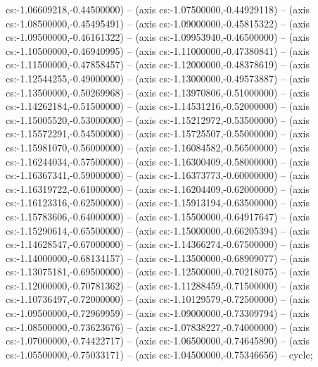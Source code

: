 cs:-1.06609218,-0.44500000) -- (axis cs:-1.07500000,-0.44929118) -- (axis cs:-1.08500000,-0.45495491) -- (axis cs:-1.09000000,-0.45815322) -- (axis cs:-1.09500000,-0.46161322) -- (axis cs:-1.09953940,-0.46500000) -- (axis cs:-1.10500000,-0.46940995) -- (axis cs:-1.11000000,-0.47380841) -- (axis cs:-1.11500000,-0.47858457) -- (axis cs:-1.12000000,-0.48378619) -- (axis cs:-1.12544255,-0.49000000) -- (axis cs:-1.13000000,-0.49573887) -- (axis cs:-1.13500000,-0.50269968) -- (axis cs:-1.13970806,-0.51000000) -- (axis cs:-1.14262184,-0.51500000) -- (axis cs:-1.14531216,-0.52000000) -- (axis cs:-1.15005520,-0.53000000) -- (axis cs:-1.15212972,-0.53500000) -- (axis cs:-1.15572291,-0.54500000) -- (axis cs:-1.15725507,-0.55000000) -- (axis cs:-1.15981070,-0.56000000) -- (axis cs:-1.16084582,-0.56500000) -- (axis cs:-1.16244034,-0.57500000) -- (axis cs:-1.16300409,-0.58000000) -- (axis cs:-1.16367341,-0.59000000) -- (axis cs:-1.16373773,-0.60000000) -- (axis cs:-1.16319722,-0.61000000) -- (axis cs:-1.16204409,-0.62000000) -- (axis cs:-1.16123316,-0.62500000) -- (axis cs:-1.15913194,-0.63500000) -- (axis cs:-1.15783606,-0.64000000) -- (axis cs:-1.15500000,-0.64917647) -- (axis cs:-1.15290614,-0.65500000) -- (axis cs:-1.15000000,-0.66205394) -- (axis cs:-1.14628547,-0.67000000) -- (axis cs:-1.14366274,-0.67500000) -- (axis cs:-1.14000000,-0.68134157) -- (axis cs:-1.13500000,-0.68909077) -- (axis cs:-1.13075181,-0.69500000) -- (axis cs:-1.12500000,-0.70218075) -- (axis cs:-1.12000000,-0.70781362) -- (axis cs:-1.11288459,-0.71500000) -- (axis cs:-1.10736497,-0.72000000) -- (axis cs:-1.10129579,-0.72500000) -- (axis cs:-1.09500000,-0.72969959) -- (axis cs:-1.09000000,-0.73309794) -- (axis cs:-1.08500000,-0.73623676) -- (axis cs:-1.07838227,-0.74000000) -- (axis cs:-1.07000000,-0.74422717) -- (axis cs:-1.06500000,-0.74645890) -- (axis cs:-1.05500000,-0.75033171) -- (axis cs:-1.04500000,-0.75346656) -- cycle;
